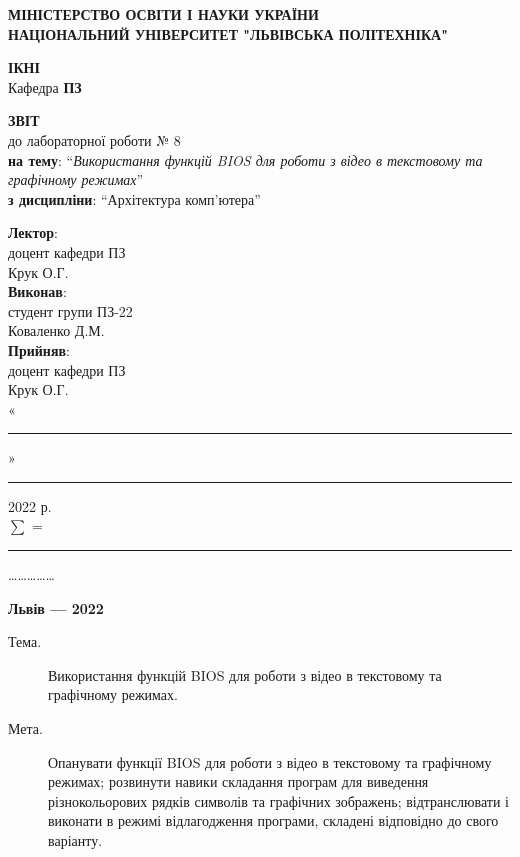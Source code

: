 \documentclass{article}
\newcommand\subject{Архітектура комп'ютера}
\newcommand\lecturer{доцент кафедри ПЗ\\Крук О.Г.}
\newcommand\teacher{доцент кафедри ПЗ\\Крук О.Г.}
\newcommand\mygroup{ПЗ-22}
\newcommand\lab{8}
\newcommand\theme{Використання функцій BIOS для роботи з відео в текстовому та графічному режимах}
\newcommand\purpose{Опанувати функції BIOS для роботи з відео в текстовому та графічному режимах; розвинути навики складання програм для виведення різнокольорових рядків символів та графічних зображень; відтранслювати і виконати в режимі відлагодження програми, складені відповідно до свого варіанту}
\begin{document}
	\begin{normalsize}
		\begin{titlepage}
			\thispagestyle{empty}
			\begin{center}
				\textbf{МІНІСТЕРСТВО ОСВІТИ І НАУКИ УКРАЇНИ\\
					НАЦІОНАЛЬНИЙ УНІВЕРСИТЕТ "ЛЬВІВСЬКА ПОЛІТЕХНІКА"}
			\end{center}
			\begin{flushright}
				\textbf{ІКНІ}\\
				Кафедра \textbf{ПЗ}
			\end{flushright}
			\vspace{200pt}
			\begin{center}
				\textbf{ЗВІТ}\\
				\vspace{10pt}
				до лабораторної роботи № \lab\\
				\textbf{на тему}: “\textit{\theme}”\\
				\textbf{з дисципліни}: “\subject”
			\end{center}
			\vspace{112pt}
			\begin{flushright}
				
				\textbf{Лектор}:\\
				\lecturer\\
				\vspace{28pt}
				\textbf{Виконав}:\\
				
				студент групи \mygroup\\
				Коваленко Д.М.\\
				\vspace{28pt}
				\textbf{Прийняв}:\\
				
				\teacher\\
				
				\vspace{28pt}
				«\rule{1cm}{0.15mm}» \rule{1.5cm}{0.15mm} 2022 р.\\
				$\sum$ = \rule{1cm}{0.15mm}……………\\
				
			\end{flushright}
			\vspace{\fill}
			\begin{center}
				\textbf{Львів — 2022}
			\end{center}
		\end{titlepage}
		
		\begin{description}
			\item[Тема.] \theme.
			\item[Мета.] \purpose.
		\end{description}
		

\end{normalsize}
\end{document}
